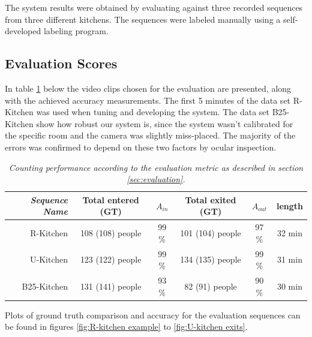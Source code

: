The system results were obtained by evaluating against three recorded sequences from three different kitchens. The sequences were labeled manually using a self-developed labeling program.

\subsection{Evaluation Scores}
In table \ref{tab:evaluation_performance} below the video clips chosen for the evaluation are presented, along with the achieved accuracy measurements. The first 5 minutes of the data set R-Kitchen was used when tuning and developing the system. The data set B25-Kitchen show how robust our system is, since the system wasn't calibrated for the specific room and the camera was slightly miss-placed. The majority of the errors was confirmed to depend on these two factors by ocular inspection.

\begin{table}[h]
\centering
	\begin{tabular}{r | c | c | c | c | c  }
			\emph{Sequence Name}		&  Total entered (GT) & \emph{$A_{in}$} & Total exited (GT) & \emph{$A_{out}$} & length \\
			\hline \hline
			R-Kitchen			& 108 (108) people & 99 \% & 101 (104) people & 97 \% & 32 min\\
			U-Kitchen			& 123 (122) people & 99 \% & 134 (135) people & 99 \% & 31 min  \\
			B25-Kitchen			& 131 (141) people & 93 \% & 82 (91) people & 90 \% & 30 min \\
			\end{tabular}
	\caption[System performance]{\textit{Counting performance according to the evaluation metric as described in section \ref{sec:evaluation}.}}
	\label{tab:evaluation_performance}
\end{table}

Plots of ground truth comparison and accuracy for the evaluation sequences can be found in figures \ref{fig:R-kitchen example} to \ref{fig:U-kitchen exits}.
\newpage


